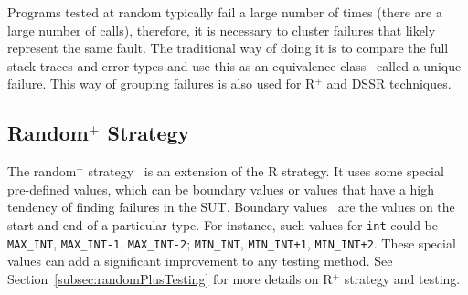 Programs tested at random typically fail a large number of times (there are a large number of calls), therefore, it is necessary to cluster failures that likely represent the same fault. The traditional way of doing it is to compare the full stack traces and error types and use this as an equivalence class~\cite{ciupa2007experimental, oriol2012random} called a unique failure. This way of grouping failures is also used for R$^+$ and DSSR techniques. 

\subsection{Random$^+$ Strategy}
The random$^+$ strategy~\cite{ciupa2007experimental, ciupa2008finding} is an extension of the R strategy. It uses some special pre-defined values, which can be boundary values or values that have a high tendency of finding failures in the SUT. Boundary values~\cite{beizer2003software} are the values on the start and end of a particular type. For instance, such values for \verb+int+ could be \verb+MAX_INT+, \verb+MAX_INT-1+, \verb+MAX_INT-2+; \verb+MIN_INT+, \verb-MIN_INT+1-, \verb-MIN_INT+2-. These special values can add a significant improvement to any testing method. See Section~\ref{subsec:randomPlusTesting} for more details on R$^+$ strategy and testing.




